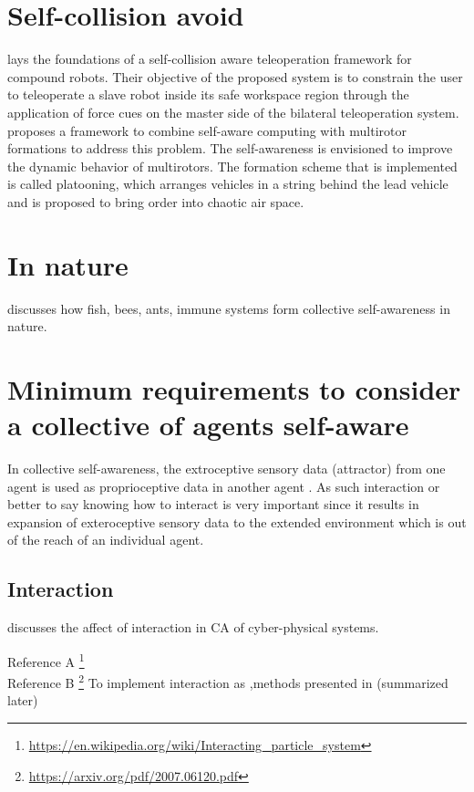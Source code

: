 \documentclass{article}
\begin{document}
	\section{Self-collision avoid}
	\cite{selvaggio-2017-towards-a-self-collision-aware-teleoperation-framework-for-compound-robots} lays the foundations of a self-collision aware teleoperation framework for compound robots. Their objective of the proposed system is to constrain the user to teleoperate a slave robot inside its safe workspace region through the application of force cues on the master side of the bilateral teleoperation system.
	\cite{kaiser-2020-towards-self-aware-multirotor-formations} proposes a framework to combine self-aware computing with multirotor formations to address this problem. The self-awareness is envisioned to improve the
	dynamic behavior of multirotors. The formation scheme that is implemented is called platooning,
	which arranges vehicles in a string behind the lead vehicle and is proposed to bring order into chaotic
	air space.
	\section{In nature}
	\citet{mitchell-2005-self-awareness-and-control-in-decentralized-systems} discusses how fish, bees, ants, immune systems form collective self-awareness in nature.
	
	\section{Minimum requirements to consider a collective of agents self-aware}
		In collective self-awareness, the extroceptive sensory data (attractor) from one agent is used as proprioceptive data in another agent \citep{regazzoni-2020-multi-sensorial-generative-and-descriptive-self-awareness-models-for-autonomous-systems}. As such interaction or better to say knowing how to interact is very important since it results in expansion of exteroceptive sensory data to the extended environment which is out of the reach of an individual agent. 
		\subsection{Interaction}
		\citet{esterle-2020-i-think-therefore-you-are-models-for-interaction-in-collectives-of-self-aware-cyber-physical-systems} discusses the affect of interaction in CA of cyber-physical systems.
		
		Reference A \footnote{\url{https://en.wikipedia.org/wiki/Interacting_particle_system}}
		\\
		Reference B \footnote{\url{https://arxiv.org/pdf/2007.06120.pdf}}
		To implement interaction as ,methods presented in \cite{baydoun-2019-prediction-of-multi-target-dynamics-using-discrete-descriptors-an-interactive-approach,kanapram-2020-collective-awareness-for-abnormality-detection-in-connected-autonomous-vehicles} (summarized later)
\end{document}
